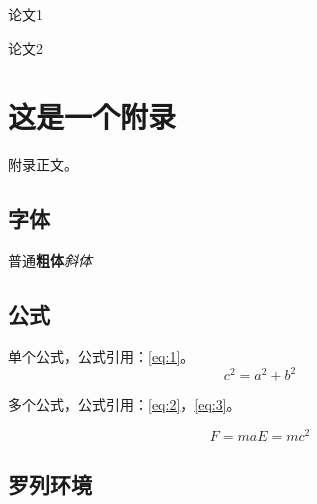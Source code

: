 {%
\appendix

\begin{publications}
    \item 论文1
    \item 论文2
\end{publications}

\chapter{这是一个附录}\label{appendix:1}
附录正文。



\section{字体}

普通\textbf{粗体}\emph{斜体}


\section{公式}

单个公式，公式引用：\autoref{eq:1}。
\begin{equation}
 c^2 = a^2 + b^2 \label{eq:1}
\end{equation}

多个公式，公式引用：\autoref{eq:2}，\autoref{eq:3}。

\begin{subequations}
\begin{equation}
  F = ma \label{eq:2}
\end{equation}
\begin{equation}
  E = mc^2 \label{eq:3}
\end{equation}
\end{subequations}

\section{罗列环境}

}
